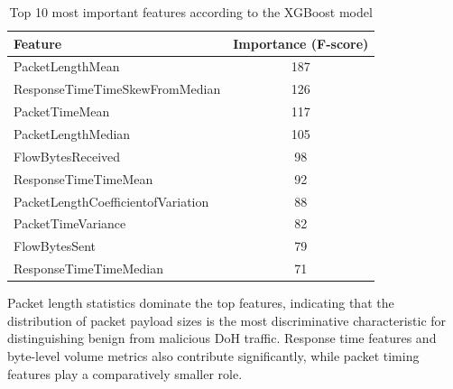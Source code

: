\documentclass[../Main.tex]{subfiles}
\begin{document}
\begin{table}[H]
\centering
\small
\begin{tabular}{|l|c|}
\hline
\textbf{Feature} & \textbf{Importance (F-score)} \\
\hline
PacketLengthMean & 187 \\
ResponseTimeTimeSkewFromMedian & 126 \\
PacketTimeMean & 117 \\
PacketLengthMedian & 105 \\
FlowBytesReceived & 98 \\
ResponseTimeTimeMean & 92 \\
PacketLengthCoefficientofVariation & 88 \\
PacketTimeVariance & 82 \\
FlowBytesSent & 79 \\
ResponseTimeTimeMedian & 71 \\
\hline
\end{tabular}
\caption{Top 10 most important features according to the XGBoost model}
\label{tab:feature_importance}
\end{table}

Packet length statistics dominate the top features, indicating that the distribution of packet payload sizes is the most discriminative characteristic for distinguishing benign from malicious DoH traffic. Response time features and byte-level volume metrics also contribute significantly, while packet timing features play a comparatively smaller role.
\end{document}
